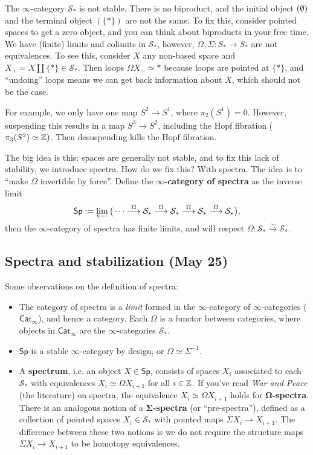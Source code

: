 \begin{example}
    The $\infty$-category $\mathcal{S}_* $ is not stable. There is no biproduct, and the initial object $(\emptyset)$ and the terminal object $(\{*\} )$ are not the same. To fix this, consider pointed spaces to get a zero object, and you can think about biproducts in your free time. We have (finite) limits and colimits in $\mathcal{S} _*$, however, $\Omega,\Sigma \colon S_* \to S_*$ are not equivalences. To see this, consider $X$ any non-based space and $X_+ =X\amalg \{*\} \in \mathcal S_* $. Then loops $\Omega X_+ \simeq *$ because loops are pointed at $\{*\} $, and ``undoing'' loops means we can get back information about $X$, which should not be the case.
    
    For example, we only have one map $S ^2 \to S^1 $, where $\pi_2(S^1 )=0$. However, suspending this results in a map $S^3\to S^2$, including the Hopf fibration ($\pi_3(S^2)\simeq \mathbb{Z} )$. Then desuspending kills the Hopf fibration.
\end{example}
\orbreak
The big idea is this: spaces are generally not stable, and to fix this lack of stability, we introduce spectra. How do we fix this? With spectra. The idea is to ``make $\Omega$ invertible by force''. Define the $\mathbf \infty$\textbf{-category of spectra} as the inverse limit \[
    \mathsf{Sp}:= \varprojlim \big( \cdots  \overset{\Omega}{\longrightarrow} \mathcal S_*\overset{\Omega}{\longrightarrow} \mathcal S_*\overset{\Omega}{\longrightarrow} \mathcal S_*\overset{\Omega}{\longrightarrow} \mathcal S_*\big),
\] then the $\infty$-category of spectra has finite limits, and  will respect $\Omega \colon \mathcal{S} _* \overset{\sim}{\to}  \mathcal{S_*} $.

\subsection{Spectra and stabilization (May 25)}
Some observations on the definition of spectra:
\begin{itemize}
\setlength\itemsep{-.2em}
    \item The category of spectra is a \emph{limit} formed in the $\infty$-category of $\infty$-categories ($\mathsf{Cat} _{\infty}$), and hence a category. Each $\Omega$ is a functor between categories, where objects in $\mathsf{Cat} _{\infty}$ are the $\infty$-categories $\mathcal{S} _*$.
    \item $\mathsf{Sp} $ is a stable $\infty$-category by design, or $\Omega \simeq \Sigma ^{-1}$.
    \item A \textbf{spectrum}, i.e. an object $X \in \mathsf{Sp} $, consists of spaces $X_i $ associated to each $\mathcal{S} _*$ with equivalences $X_i \simeq \Omega X_{i+1}$ for all $i \in \mathbb{Z}$. If you've read \emph{War and Peace} (the literature) on spectra, the equivalence $X_i\simeq \Omega X_{i+1} $ holds for $\mathbf \Omega$\textbf{-spectra}. There is an analogous notion of a $\mathbf \Sigma$\textbf{-spectra} (or ``pre-spectra''), defined as a collection of pointed spaces $X_i \in \mathcal{S} _* $ with pointed maps $\Sigma X_i  \to X_{i+1}$. The difference between these two notions is we do not require the structure maps $\Sigma X_i  \to X_{i+1}$ to be homotopy equivalences.
\end{itemize}

